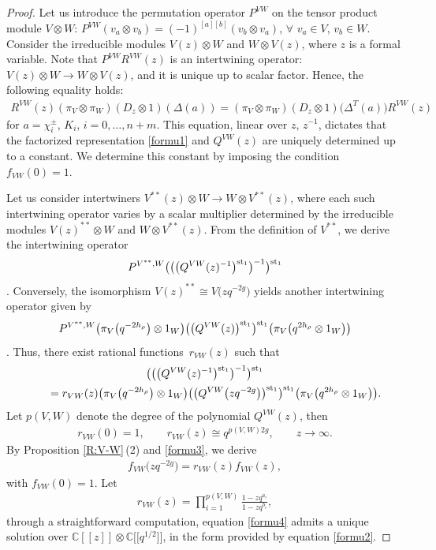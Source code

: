 \documentclass[10pt,a4paper]{amsart}
\numberwithin{equation}{section}
\begin{document}
\begin{proof}
Let us introduce the permutation operator $P^{VW}$ on the tensor product module $V\otimes W$: $P^{VW}(v_a\otimes v_b)=(-1)^{[a][b]}(v_b\otimes v_a)$, $\forall$ $v_a\in V$, $v_b\in W$. Consider the irreducible modules $V(z)\otimes W$ and $W\otimes V(z)$, where $z$ is a formal variable. Note that $P^{VW}R^{VW}(z)$ is an intertwining operator: $V(z)\otimes W\rightarrow W\otimes V(z)$, and it is unique up to scalar factor.
Hence, the following equality holds:
\begin{gather*}
 R^{VW}(z)(\pi_V\otimes\pi_W)(D_z\otimes1)(\Delta(a))=(\pi_V\otimes\pi_W)(D_z\otimes1)\bigl(\Delta^T(a)\bigr)R^{VW}(z)
\end{gather*}
for $a=\chi_i^{\pm}$, $K_i$, $i=0,\dots,n+m$. This equation, linear over $z$, $z^{-1}$, dictates that the factorized representation \eqref{formu1} and $Q^{VW}(z)$ are uniquely determined up to a constant. We determine this constant by imposing the condition $f_{VW}(0)=1$.

Let us consider intertwiners $V^{\ast\ast}(z)\otimes W\rightarrow W\otimes V^{\ast\ast}(z)$, where each such intertwining operator varies by a scalar multiplier determined by the irreducible modules $V(z)^{\ast\ast}\otimes W$ and $W\otimes V^{\ast\ast}(z)$. From the definition of $V^{\ast\ast}$, we derive the intertwining operator \[P^{V^{\ast\ast},W} \bigl(\bigl(\bigl(Q^{VW}(z)^{-1}\bigr)^{{\rm st}_1}\bigr)^{-1}\bigr)^{{\rm st}_1}\]. Conversely, the isomorphism $V(z)^{\ast\ast}\cong V\bigl(zq^{-2g}\bigr)$ yields another intertwining operator given by
 \[P^{V^{\ast\ast},W}\bigl(\pi_V\bigl(q^{-2h_\rho}\bigr)\otimes1_W\bigr)
\bigl(\bigl(Q^{VW}(z)\bigr)^{{\rm st}_1}\bigr)^{{\rm st}_1}\bigl(\pi_V\bigl(q^{2h_\rho}\otimes1_W\bigr)\bigr)\]. Thus, there exist rational functions~$r_{VW}(z)$ such that
\begin{gather}
 \bigl(\bigl(\bigl(Q^{VW}(z)^{-1}\bigr)^{{\rm st}_1}\bigr)^{-1}\bigr)^{{\rm st}_1}\nonumber\\
 \qquad=r_{VW}(z)\bigl(\pi_V\bigl(q^{-2h_\rho}\bigr)\otimes1_W\bigr)
\bigl(\bigl(Q^{VW}\bigl(zq^{-2g}\bigr)\bigr)^{{\rm st}_1}\bigr)^{{\rm st}_1}\bigl(\pi_V\bigl(q^{2h_\rho}\otimes1_W\bigr)\bigr).\label{formu3}
\end{gather}
Let $p(V,W)$ denote the degree of the polynomial $Q^{VW}(z)$, then
\begin{gather*}
 r_{VW}(0)=1,\qquad r_{VW}(z)\cong q^{p(V,W)2g},\qquad z\rightarrow\infty.
\end{gather*}
By Proposition \ref{R:V-W}\,(2) and \eqref{formu3}, we derive
\begin{gather}\label{formu4}
 f_{VW}\bigl(zq^{-2g}\bigr)= r_{VW}(z) f_{VW}(z),
\end{gather}
with $f_{VW}(0)=1$.
Let
\begin{gather*}%
 r_{VW}(z)=\prod\limits_{i=1}^{p(V,W)}\frac{1-zq^{a_i}}{1-zq^{b_i}},
\end{gather*}
through a straightforward computation, equation \eqref{formu4} admits a unique solution over $\mathbb{C}[[z]]\otimes\mathbb{C}\bigl[\bigl[q^{1/2}\bigr]\bigr]$, in the form provided by equation \eqref{formu2}.
\end{proof}
\end{document}
